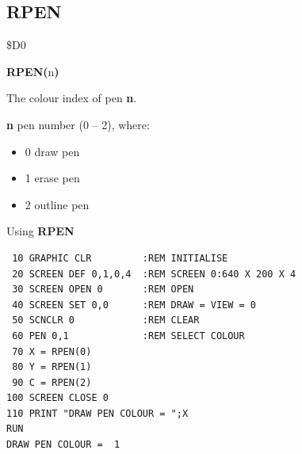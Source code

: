 \subsection{RPEN}
\begin{description}[leftmargin=2cm,style=nextline]
\item [Token:] \$D0
\item [Format:] {\bf RPEN(}n{\bf)}
\item [Returns:]  The colour index of pen {\bf n}.

                {\bf n} pen number (0 -- 2), where:

                \begin{itemize}
                    \item {0} draw pen
                    \item {1} erase pen
                    \item {2} outline pen
                \end{itemize}

\item [Example:] Using {\bf RPEN}

\begin{tcolorbox}[colback=black,coltext=white]
\verbatimfont{\codefont}
\begin{verbatim}
 10 GRAPHIC CLR         :REM INITIALISE
 20 SCREEN DEF 0,1,0,4  :REM SCREEN 0:640 X 200 X 4
 30 SCREEN OPEN 0       :REM OPEN
 40 SCREEN SET 0,0      :REM DRAW = VIEW = 0
 50 SCNCLR 0            :REM CLEAR
 60 PEN 0,1             :REM SELECT COLOUR
 70 X = RPEN(0)
 80 Y = RPEN(1)
 90 C = RPEN(2)
100 SCREEN CLOSE 0
110 PRINT "DRAW PEN COLOUR = ";X
RUN
DRAW PEN COLOUR =  1
\end{verbatim}
\end{tcolorbox}
\end{description}


\newpage
